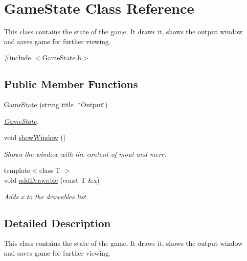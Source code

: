 \hypertarget{classGameState}{}\section{Game\+State Class Reference}
\label{classGameState}


This class contains the state of the game. It draws it, shows the output window and saves game for further viewing.  




{\ttfamily \#include $<$Game\+State.\+h$>$}

\subsection*{Public Member Functions}
\begin{DoxyCompactItemize}
\item 
\hyperlink{classGameState_a8114bd207c6d773fc0daa74044bbc413}{Game\+State} (string title=\char`\"{}Output\char`\"{})
\begin{DoxyCompactList}\small\item\em \hyperlink{classGameState}{Game\+State}. \end{DoxyCompactList}\item 
void \hyperlink{classGameState_a674de8e50152a5e0bfa55497d1702146}{show\+Window} ()\hypertarget{classGameState_a674de8e50152a5e0bfa55497d1702146}{}\label{classGameState_a674de8e50152a5e0bfa55497d1702146}

\begin{DoxyCompactList}\small\item\em Shows the window with the content of mout and merr. \end{DoxyCompactList}\item 
{\footnotesize template$<$class T $>$ }\\void \hyperlink{classGameState_a0727ed66fcae2802005c59eada1eee46}{add\+Drawable} (const T \&x)
\begin{DoxyCompactList}\small\item\em Adds x to the drawables list. \end{DoxyCompactList}\end{DoxyCompactItemize}


\subsection{Detailed Description}
This class contains the state of the game. It draws it, shows the output window and saves game for further viewing. 

